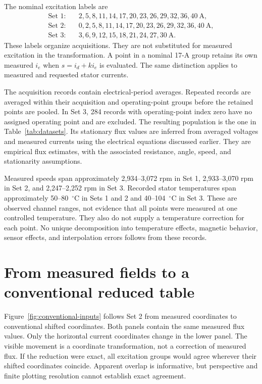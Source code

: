 The nominal excitation labels are
\begin{align*}
\text{Set 1:}\quad&2,5,8,11,14,17,20,23,26,29,32,36,40\ \mathrm A,\\
\text{Set 2:}\quad&0,2,5,8,11,14,17,20,23,26,29,32,36,40\ \mathrm A,\\
\text{Set 3:}\quad&3,6,9,12,15,18,21,24,27,30\ \mathrm A.
\end{align*}
These labels organize acquisitions. They are not substituted for measured excitation in the transformation. A point in a nominal 17-A group retains its own measured $i_e$ when $s=i_d+k i_e$ is evaluated. The same distinction applies to measured and requested stator currents.

The acquisition records contain electrical-period averages. Repeated records are averaged within their acquisition and operating-point groups before the retained points are pooled. In Set 3, 284 records with operating-point index zero have no assigned operating point and are excluded. The resulting population is the one in Table~\ref{tab:datasets}. Its stationary flux values are inferred from averaged voltages and measured currents using the electrical equations discussed earlier. They are empirical flux estimates, with the associated resistance, angle, speed, and stationarity assumptions.

Measured speeds span approximately 2,934--3,072 rpm in Set 1, 2,933--3,070 rpm in Set 2, and 2,247--2,252 rpm in Set 3. Recorded stator temperatures span approximately 50--80~$^\circ$C in Sets 1 and 2 and 40--104~$^\circ$C in Set 3. These are observed channel ranges, not evidence that all points were measured at one controlled temperature. They also do not supply a temperature correction for each point. No unique decomposition into temperature effects, magnetic behavior, sensor effects, and interpolation errors follows from these records.

\section{From measured fields to a conventional reduced table}

Figure~\ref{fig:conventional-inputs} follows Set 2 from measured coordinates to conventional shifted coordinates. Both panels contain the same measured flux values. Only the horizontal current coordinates change in the lower panel. The visible movement is a coordinate transformation, not a correction of measured flux. If the reduction were exact, all excitation groups would agree wherever their shifted coordinates coincide. Apparent overlap is informative, but perspective and finite plotting resolution cannot establish exact agreement.

